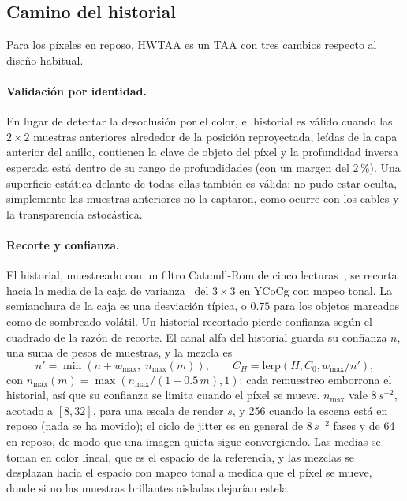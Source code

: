 \documentclass[11pt,a4paper]{article}
\begin{document}
\subsection{Camino del historial}
\label{sec:history}

Para los píxeles en reposo, HWTAA es un TAA con tres cambios respecto al diseño habitual.

\paragraph{Validación por identidad.} En lugar de detectar la desoclusión por el color, el historial es válido cuando las $2\times2$ muestras anteriores alrededor de la posición reproyectada, leídas de la capa anterior del anillo, contienen la clave de objeto del píxel y la profundidad inversa esperada está dentro de su rango de profundidades (con un margen del 2\,\%). Una superficie estática delante de todas ellas también es válida: no pudo estar oculta, simplemente las muestras anteriores no la captaron, como ocurre con los cables y la transparencia estocástica.

\paragraph{Recorte y confianza.} El historial, muestreado con un filtro Catmull-Rom de cinco lecturas~\cite{jimenez2016filmic}, se recorta hacia la media de la caja de varianza~\cite{salvi2016taa} del $3\times3$ en YCoCg con mapeo tonal. La semianchura de la caja es una desviación típica, o $0.75$ para los objetos marcados como de sombreado volátil. Un historial recortado pierde confianza según el cuadrado de la razón de recorte. El canal alfa del historial guarda su confianza $n$, una suma de pesos de muestras, y la mezcla es
\begin{equation}
n' = \min(n + w_{\max},\; n_{\max}(m)), \qquad C_H = \mathrm{lerp}(H, C_0, w_{\max}/n'),
\end{equation}
con $n_{\max}(m) = \max(n_{\max}/(1+0.5\,m), 1)$: cada remuestreo emborrona el historial, así que su confianza se limita cuando el píxel se mueve. $n_{\max}$ vale $8\,s^{-2}$, acotado a $[8,32]$, para una escala de render $s$, y 256 cuando la escena está en reposo (nada se ha movido); el ciclo de jitter es en general de $8\,s^{-2}$ fases y de 64 en reposo, de modo que una imagen quieta sigue convergiendo. Las medias se toman en color lineal, que es el espacio de la referencia, y las mezclas se desplazan hacia el espacio con mapeo tonal a medida que el píxel se mueve, donde si no las muestras brillantes aisladas dejarían estela.
\end{document}

